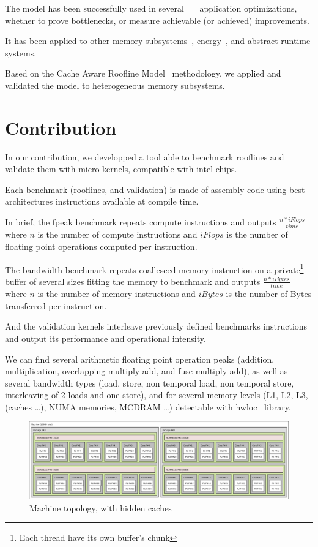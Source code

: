 \documentclass[runningheads,a4paper]{llncs}
\begin{document}
The model has been successfully used in
several~\cite{Kim20111201}~\cite{Rossinelli2164}~\cite{vanNieuwpoort:2009:UMH:1542275.1542337} application optimizations, whether
to prove bottlenecks, or measure achievable (or achieved) improvements.

It has been applied to other memory subsystems~\cite{ilic2014cache}, energy~\cite{7493653}, and abstract runtime systems.

Based on the Cache Aware Roofline Model~\cite{ilic2014cache} methodology, we applied and validated the model to heterogeneous memory subsystems.

\section{Contribution}
\label{sec:contrib}

In our contribution, we developped a tool able to benchmark rooflines and validate them with micro kernels, compatible with intel chips.

Each benchmark (rooflines, and validation) is made of assembly code using best architectures instructions available at compile
time.

In brief, the fpeak benchmark repeats compute instructions and outputs $\frac{n*iFlops}{time}$ where $n$ is the number of compute instructions and $iFlops$ is the number of floating point operations computed per instruction.

The bandwidth benchmark repeats coallesced memory instruction on a private\footnote{Each thread have its own buffer's chunk} buffer of several sizes fitting the memory to benchmark and outputs $\frac{n*iBytes}{time}$ where $n$ is the number of memory instructions and $iBytes$ is the number of Bytes transferred per instruction.

And the validation kernels interleave previously defined benchmarks instructions and output its performance and operational intensity.

We can find several arithmetic floating point operation peaks (addition, multiplication, overlapping multiply add, and fuse
multiply add), as well as several bandwidth types (load, store, non temporal load, non temporal store, interleaving of 2 loads and one store), and for several memory levels (L1, L2, L3, (caches \dots), NUMA memories, MCDRAM \dots) detectable with hwloc~\cite{6903671} library.

\begin{figure}
  \centering
  \includegraphics[width=\textwidth]{pictures/Xeon_E5_2650L_v4}
  \caption{Machine topology, with hidden caches}
  \label{fig:joe0}
\end{figure}
\end{document}
